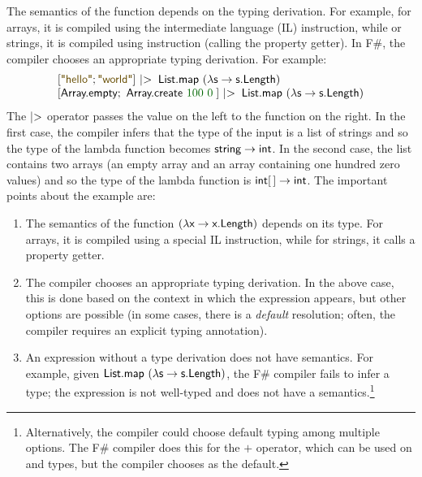 The semantics of the function depends on the typing derivation. For example, for arrays, it is
compiled using the  intermediate language (IL) instruction, while or strings, it is
compiled using  instruction (calling the property getter). In F\#, the compiler chooses
an appropriate typing derivation. For example:
%
\begin{equation*}
\begin{array}{l}
  \lbrack \str{hello};\str{world} \rbrack ~|\hspace{-0.25em}>\;\ident{List.map}~(\lambda\ident{s}\rightarrow\ident{s.Length})\\
  \lbrack \ident{Array.empty};~\ident{Array.create}~\num{100}~\num{0}\; \rbrack ~|\hspace{-0.25em}>\;\ident{List.map}~(\lambda\ident{s}\rightarrow\ident{s.Length})\\
\end{array}
\end{equation*}
%
The $|\hspace{-0.25em}>$ operator passes the value on the left to the function on the right. In
the first case, the compiler infers that the type of the input is a list of strings and so the
type of the lambda function becomes $\textnormal{\sffamily string}\rightarrow\textnormal{\sffamily int}$. In the second case,
the list contains two arrays (an empty array and an array containing one hundred zero values) and so
the type of the lambda function is $\textnormal{\sffamily int}\lbrack\,\rbrack\rightarrow\textnormal{\sffamily int}$.
The important points about the example are:
%
\begin{enumerate}
\item The semantics of the function $(\lambda\textnormal{\sffamily x}\rightarrow\textnormal{\sffamily x.Length})$
  depends on its type. For arrays, it is compiled using a special IL instruction, while for
  strings, it calls a property getter.

\item The compiler chooses an appropriate typing derivation. In the above case, this is done
  based on the context in which the expression appears, but other options are possible
  (in some cases, there is a \emph{default} resolution; often, the compiler requires an
  explicit typing annotation).

\item An expression without a type derivation does not have semantics. For example, given
  $\textnormal{\sffamily List.map}~(\lambda\textnormal{\sffamily s}\rightarrow\textnormal{\sffamily s.Length})$, the F\# compiler fails to
  infer a type; the expression is not well-typed and does not have a semantics.\footnote{Alternatively,
  the compiler could choose default typing among multiple options. The F\# compiler does this
  for the $+$ operator, which can be used on  and  types, but the compiler
  chooses  as the default.}
\end{enumerate}

